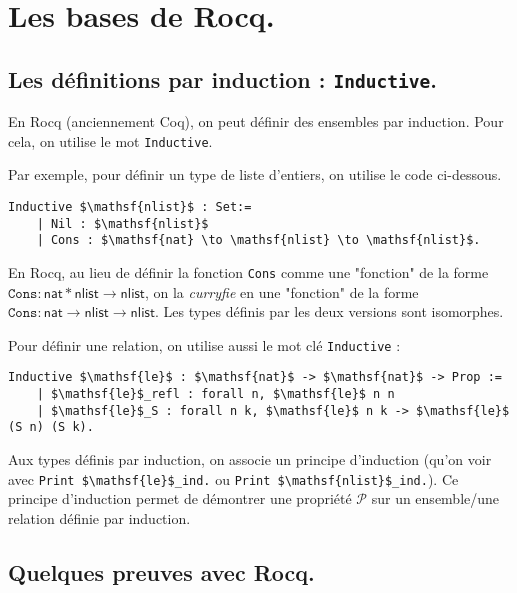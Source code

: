 \documentclass[../main]{subfiles}
\begin{document}
  \chapter{Les bases de Rocq.} {
  \lstset{language=Coq}
  \section{Les définitions par induction : \lstinline|Inductive|.}

  En Rocq (anciennement Coq), on peut définir des ensembles par induction.
  Pour cela, on utilise le mot \lstinline|Inductive|.

  Par exemple, pour définir un type de liste d'entiers, on utilise le code ci-dessous.

  \begin{lstlisting}[caption=Définition du type $\mathsf{nlist}$ en Rocq]
    Inductive $\mathsf{nlist}$ : Set:=
    | Nil : $\mathsf{nlist}$
    | Cons : $\mathsf{nat} \to \mathsf{nlist} \to \mathsf{nlist}$.
  \end{lstlisting}

  En Rocq, au lieu de définir la fonction \texttt{Cons} comme une "fonction" de la forme $\mathtt{Cons} : \mathsf{nat} * \mathsf{nlist} \to \mathsf{nlist}$, on la \textit{curryfie} en une "fonction" de la forme $\mathtt{Cons} : \mathsf{nat} \to \mathsf{nlist} \to \mathsf{nlist}$. Les types définis par les deux versions sont isomorphes.


  Pour définir une relation, on utilise aussi le mot clé \lstinline|Inductive| :

  \begin{lstlisting}[caption=Définition de la relation $\mathsf{le}$]
    Inductive $\mathsf{le}$ : $\mathsf{nat}$ -> $\mathsf{nat}$ -> Prop :=
    | $\mathsf{le}$_refl : forall n, $\mathsf{le}$ n n
    | $\mathsf{le}$_S : forall n k, $\mathsf{le}$ n k -> $\mathsf{le}$ (S n) (S k).
  \end{lstlisting}

  Aux types définis par induction, on associe un principe d'induction (qu'on voir avec \lstinline|Print $\mathsf{le}$_ind.| ou   \lstinline|Print $\mathsf{nlist}$_ind.|).
  Ce principe d'induction permet de démontrer une propriété $\mathcal{P}$ sur un ensemble/une relation définie par induction.

  \section{Quelques preuves avec Rocq.}

}
\end{document}
